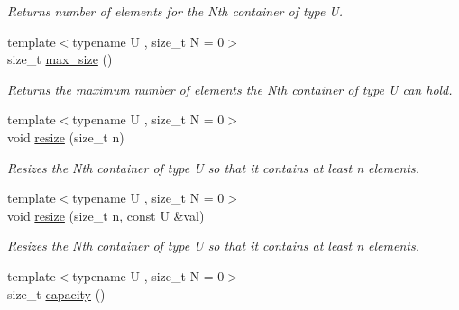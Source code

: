 \begin{DoxyCompactItemize}
\begin{DoxyCompactList}\small\item\em Returns number of elements for the Nth container of type U. \end{DoxyCompactList}\item 
\hypertarget{classheterogeneous_1_1heterovector_3_01_t_00_01_types_8_8_8_4_aaf0cab2093bf2f8abd6d2b834763ec02}{}{\footnotesize template$<$typename U , size\+\_\+t N = 0$>$ }\\size\+\_\+t \hyperlink{classheterogeneous_1_1heterovector_3_01_t_00_01_types_8_8_8_4_aaf0cab2093bf2f8abd6d2b834763ec02}{max\+\_\+size} ()\label{classheterogeneous_1_1heterovector_3_01_t_00_01_types_8_8_8_4_aaf0cab2093bf2f8abd6d2b834763ec02}

\begin{DoxyCompactList}\small\item\em Returns the maximum number of elements the Nth container of type U can hold. \end{DoxyCompactList}\item 
\hypertarget{classheterogeneous_1_1heterovector_3_01_t_00_01_types_8_8_8_4_a13cd1f80cfb6cc2dea5d77cc4dc23bdf}{}{\footnotesize template$<$typename U , size\+\_\+t N = 0$>$ }\\void \hyperlink{classheterogeneous_1_1heterovector_3_01_t_00_01_types_8_8_8_4_a13cd1f80cfb6cc2dea5d77cc4dc23bdf}{resize} (size\+\_\+t n)\label{classheterogeneous_1_1heterovector_3_01_t_00_01_types_8_8_8_4_a13cd1f80cfb6cc2dea5d77cc4dc23bdf}

\begin{DoxyCompactList}\small\item\em Resizes the Nth container of type U so that it contains at least n elements. \end{DoxyCompactList}\item 
\hypertarget{classheterogeneous_1_1heterovector_3_01_t_00_01_types_8_8_8_4_a4c63ea07b567c36657aa00bf4afc9364}{}{\footnotesize template$<$typename U , size\+\_\+t N = 0$>$ }\\void \hyperlink{classheterogeneous_1_1heterovector_3_01_t_00_01_types_8_8_8_4_a4c63ea07b567c36657aa00bf4afc9364}{resize} (size\+\_\+t n, const U \&val)\label{classheterogeneous_1_1heterovector_3_01_t_00_01_types_8_8_8_4_a4c63ea07b567c36657aa00bf4afc9364}

\begin{DoxyCompactList}\small\item\em Resizes the Nth container of type U so that it contains at least n elements. \end{DoxyCompactList}\item 
\hypertarget{classheterogeneous_1_1heterovector_3_01_t_00_01_types_8_8_8_4_a8505ed548c3336ea36ab64400b509440}{}{\footnotesize template$<$typename U , size\+\_\+t N = 0$>$ }\\size\+\_\+t \hyperlink{classheterogeneous_1_1heterovector_3_01_t_00_01_types_8_8_8_4_a8505ed548c3336ea36ab64400b509440}{capacity} ()\label{classheterogeneous_1_1heterovector_3_01_t_00_01_types_8_8_8_4_a8505ed548c3336ea36ab64400b509440}


\end{DoxyCompactItemize}
